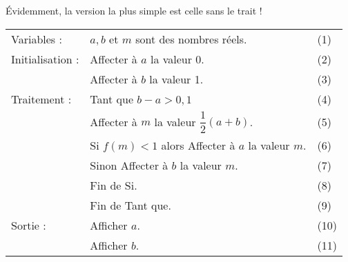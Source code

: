 \documentclass[french,12pt]{report}
\begin{document}
\ReglePied


\psframebox[fillstyle=solid,fillcolor= white,linewidth=0.4pt,linecolor=blue,linearc=0.05,cornersize=absolute]{
\begin{minipage}{17.7cm}
\begin{center}
\textcolor{blue}{\Large \textsc{\textbf{}}} \par
\textcolor{blue}{\Large \textsc{\textbf{}}} \par
\end{center}
\end{minipage}
}
\bigskip

\'Evidemment, la version la plus simple est celle sans le trait !\bigskip

\begin{center}
\begin{tabular}{|p{3cm} p{8cm} p{1cm}|}
\hline
Variables :         & $a, b$ et $m$ sont des nombres réels.                 & (1)\\
Initialisation :    & Affecter à $a$ la valeur $0$.                                 & (2) \\
	                     & Affecter à $b$ la valeur 1.                                     & (3)\\
Traitement :      & Tant que $b - a > 0,1$                                          &(4)\\
                         & \qquad Affecter à $m$ la valeur $\dfrac{1}{2}(a + b)$.      & (5)\\
                         & \qquad Si $f(m) < 1$ alors Affecter à $a$ la valeur $m$.    & (6)\\
                         & \qquad Sinon Affecter à $b$ la valeur $m$.                      & (7)\\
                        & \qquad Fin de Si.                                                                & (8)\\
                        &Fin de Tant que.                                                       &(9)\\
Sortie :            &Afficher $a$.                                                              &(10)\\
                        & Afficher $b$.                                                             &(11)\\
\hline
\end{tabular}
\end{center}\bigskip
\end{document}
